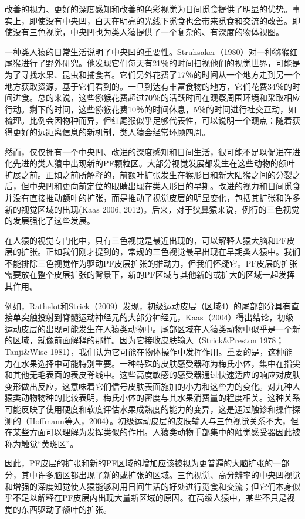 改善的视力、更好的深度感知和改善的色彩视觉为日间觅食提供了明显的优势。事实上，即使没有中央凹，白天在明亮的光线下觅食也会带来觅食和交流的改善。即使没有三色视觉，中央凹也为类人猿提供了一个复杂的、有深度的物体视图。

一种类人猿的日常生活说明了中央凹的重要性。Struhsaker（1980）对一种猕猴红尾猴进行了野外研究。他发现它们每天有21％的时间扫视他们的视觉世界，可能是为了寻找水果、昆虫和捕食者。它们另外花费了17％的时间从一个地方走到另一个地方获取资源，基于它们看到的。一旦到达有丰富食物的地方，它们花费34％的时间进食。总的来说，这些猕猴花费超过70％的活跃时间在观察周围环境和采取相应行动。剩下的时间，这些猕猴花费10％的时间休息，5％的时间进行社交互动，如梳理。比例会因物种而异，但红尾猴似乎足够代表性，可以说明一个观点：随着获得更好的远距离信息的新机制，类人猿会经常环顾四周。

然而，仅仅拥有一个中央凹、改进的深度感知和日间生活，很可能不足以促进在进化先进的类人猿中出现新的PF颗粒区。大部分视觉发展都发生在这些动物的额叶扩展之前。正如之前所解释的，前额叶扩张发生在猴形目和新大陆猴之间的分裂之后，但中央凹和更向前定位的眼睛出现在类人形目的早期。改进的视力和日间觅食并没有直接推动额叶的扩张，而是推动了视觉皮层的明显变化，包括其扩张和许多新的视觉区域的出现(Kaas 2006, 2012)。后来，对于狭鼻猿来说，例行的三色视觉的发展强化了这些发展。

在人猿的视觉专门化中，只有三色视觉是最近出现的，可以解释人猿大脑和PF皮层的扩张。正如我们刚才提到的，常规的三色视觉最早出现在早期类人猿中。我们不能排除三色视觉作为驱动PF皮层扩张的推动力，但我们怀疑它。PF皮层的扩张需要放在整个皮层扩张的背景下，新的PF区域与其他新的或扩大的区域一起发挥其作用。

例如，Rathelot和Strick（2009）发现，初级运动皮层（区域4）的尾部部分具有直接单突触投射到脊髓运动神经元的大部分神经元，Kaas（2004）得出结论，初级运动皮层的出现可能发生在人猿类动物中。尾部区域在人猿类动物中似乎是一个新的区域，就像前面解释的那样。因为它接收皮肤输入（Strick\&Preston 1978；Tanji\&Wise 1981），我们认为它可能在物体操作中发挥作用。重要的是，这种能力在水果选择中可能特别重要。一种特殊的皮肤感受器称为梅氏小体，集中在指尖和其他无毛表面的表皮脊线中。这些高度敏感的感受器通过快速适应的响应对皮肤变形做出反应，这意味着它们信号皮肤表面施加的小力和这些力的变化。对九种人猿类动物物种的比较表明，梅氏小体的密度与其水果消费量的程度相关。这种关系可能反映了使用硬度和软度评估水果成熟度的能力的变异，这是通过触诊和操作探测的（Hoffmann等人，2004）。初级运动皮层的皮肤输入与三色视觉关系不大，但在某些方面可以理解为发挥类似的作用。人猿类动物手部集中的触觉感受器因此被称为触觉“黄斑区”。

因此，PF皮层的扩张和新的PF区域的增加应该被视为更普遍的大脑扩张的一部分，其中许多脑区都出现了新的或扩张的区域。三色视觉、高分辨率的中央凹视觉和增强的深度知觉使人猿能够利用日间生活的好处进行觅食和交流；但它们本身似乎不足以解释在PF皮层内出现大量新区域的原因。在高级人猿中，某些不只是视觉的东西驱动了额叶的扩张。

